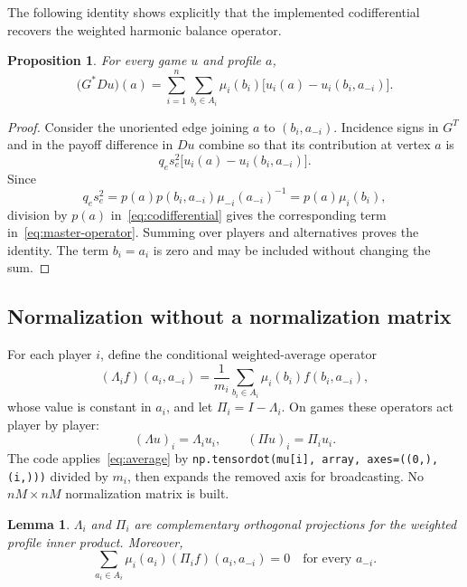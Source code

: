 \documentclass[11pt]{article}
\newtheorem{proposition}{Proposition}
\newtheorem{lemma}{Lemma}
\begin{document}
The following identity shows explicitly that the implemented codifferential
recovers the weighted harmonic balance operator.

\begin{proposition}
For every game $u$ and profile $a$,
\begin{equation}
 \bigl(G^*Du\bigr)(a)
 =\sum_{i=1}^n\sum_{b_i\in A_i}\mu_i(b_i)
   \bigl[u_i(a)-u_i(b_i,a_{-i})\bigr].
 \label{eq:master-operator}
\end{equation}
\end{proposition}

\begin{proof}
Consider the unoriented edge joining $a$ to $(b_i,a_{-i})$.  Incidence signs
in $G^T$ and in the payoff difference in $Du$ combine so that its contribution
at vertex $a$ is
\[
 q_es_e^2\bigl[u_i(a)-u_i(b_i,a_{-i})\bigr].
\]
Since
\[
 q_es_e^2
 =p(a)p(b_i,a_{-i})\mu_{-i}(a_{-i})^{-1}
 =p(a)\mu_i(b_i),
\]
division by $p(a)$ in~\eqref{eq:codifferential} gives the corresponding term
in~\eqref{eq:master-operator}.  Summing over players and alternatives proves
the identity.  The term $b_i=a_i$ is zero and may be included without changing
the sum.
\end{proof}

\subsection{Normalization without a normalization matrix}

For each player $i$, define the conditional weighted-average operator
\begin{equation}
 (\Lambda_i f)(a_i,a_{-i})
 =\frac{1}{m_i}\sum_{b_i\in A_i}\mu_i(b_i)f(b_i,a_{-i}),
 \label{eq:average}
\end{equation}
whose value is constant in $a_i$, and let $\Pi_i=I-\Lambda_i$.  On games these
operators act player by player:
\[
 (\Lambda u)_i=\Lambda_i u_i,
 \qquad
 (\Pi u)_i=\Pi_i u_i.
\]
The code applies~\eqref{eq:average} by
\texttt{np.tensordot(mu[i], array, axes=((0,), (i,)))} divided by $m_i$, then
expands the removed axis for broadcasting.  No $nM\times nM$ normalization
matrix is built.

\begin{lemma}
$\Lambda_i$ and $\Pi_i$ are complementary orthogonal projections for the
weighted profile inner product.  Moreover,
\begin{equation}
 \sum_{a_i\in A_i}\mu_i(a_i)(\Pi_i f)(a_i,a_{-i})=0
 \quad\text{for every }a_{-i}.
 \label{eq:normalization-condition}
\end{equation}
\end{lemma}
\end{document}
